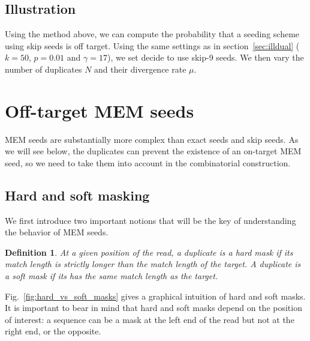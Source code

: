 \documentclass{article}
\newtheorem{definition}{Definition}
\begin{document}
\subsection{Illustration}
\label{sec:illskipdual}

Using the method above, we can compute the probability that a seeding
scheme using skip seeds is off target. Using the same settings as in
section~\ref{sec:illdual} ($k=50$, $p=0.01$ and $\gamma=17$), we set
decide to use skip-9 seeds. We then vary the number of duplicates $N$ and
their divergence rate $\mu$.



\section{Off-target MEM seeds}

MEM seeds are substantially more complex than exact seeds and skip seeds.
As we will see below, the duplicates can prevent the existence of an
on-target MEM seed, so we need to take them into account in the
combinatorial construction.


\subsection{Hard and soft masking}

We first introduce two important notions that will be the key of
understanding the behavior of MEM seeds.

\begin{definition}
At a given position of the read, a duplicate is a \emph{hard mask} if its
match length is strictly longer than the match length of the target. A
duplicate is a \emph{soft mask} if its has the same match length as the
target.
\end{definition}

Fig.~\ref{fig:hard_vs_soft_masks} gives a graphical intuition of hard and
soft masks. It is important to bear in mind that hard and soft masks
depend on the position of interest: a sequence can be a mask at the left
end of the read but not at the right end, or the opposite.
\end{document}
